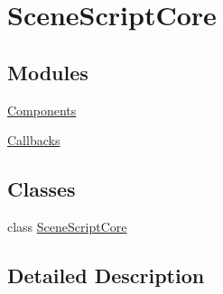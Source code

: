 \hypertarget{group__gr__scriptcore}{}\section{Scene\+Script\+Core}
\label{group__gr__scriptcore}
\subsection*{Modules}
\begin{DoxyCompactItemize}
\item 
\hyperlink{group__gr__scriptcore__parts}{Components}
\item 
\hyperlink{group__gr__callback}{Callbacks}
\end{DoxyCompactItemize}
\subsection*{Classes}
\begin{DoxyCompactItemize}
\item 
class \hyperlink{class_scene_script_core}{Scene\+Script\+Core}
\end{DoxyCompactItemize}


\subsection{Detailed Description}
